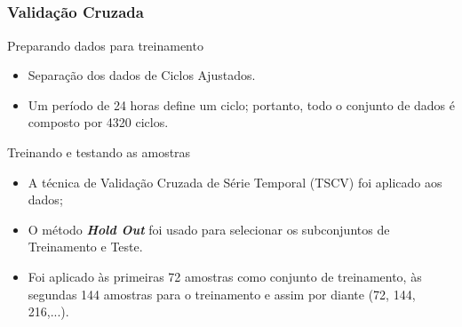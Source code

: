 \documentclass[aspectratio=169]{beamer}
\begin{document}
\subsection{}
\begin{frame}
\frametitle{Validação Cruzada}
\small
\begin{block}{Preparando dados para treinamento}
\begin{itemize} \small
    \item Separação dos dados de Ciclos Ajustados.
    \item Um período de 24 horas define um ciclo; portanto, todo o conjunto de dados é composto por 4320 ciclos.
\end{itemize}
\end{block}

\begin{block}{Treinando e testando as amostras}
\begin{itemize} \small
    \item A técnica de Validação Cruzada de Série Temporal (TSCV) foi aplicado aos dados;
    \item O método \textbf{\textit{Hold Out}} foi usado para selecionar os subconjuntos de Treinamento e Teste.
    \item Foi aplicado às primeiras 72 amostras como conjunto de treinamento, às segundas 144 amostras para o treinamento e assim por diante (72, 144, 216,...).
\end{itemize}
\end{block}
\end{frame}
\end{document}
